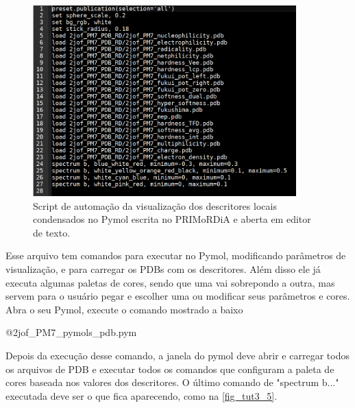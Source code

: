 \documentclass[a4paper,11pt]{refart}
\begin{document}
\hspace*{-\leftmarginwidth}
\begin{minipage}{\fullwidth}
	\begin{figure}[H]
		\begin{center}
			\includegraphics[width=4in]{images/tut3_img5}
			\caption{Script de automação da visualização dos descritores locais condensados no Pymol escrita no PRIMoRDiA e aberta em editor de texto.}
			\label{fig_tut3_3}
		\end{center}
	\end{figure}
\end{minipage}

Esse arquivo tem comandos para executar no Pymol, modificando parâmetros de visualização, e para carregar os PDBs com os descritores. Além disso ele já executa algumas paletas de cores, sendo que uma vai sobrepondo a outra, mas servem para o usuário pegar e escolher uma ou modificar seus parâmetros e cores. Abra o seu Pymol,  execute o comando mostrado a baixo

\hspace*{-\leftmarginwidth}
\begin{minipage}{\fullwidth}
	\begin{pymol}@2jof_PM7_pymols_pdb.pym\end{pymol}
\end{minipage}

Depois da execução desse comando, a janela do pymol deve abrir e carregar todos os arquivos de PDB e executar todos os comandos que configuram a paleta de cores baseada nos valores dos descritores. O último comando de "spectrum b..." executada deve ser o que fica aparecendo, como na \autoref{fig_tut3_5}.
\end{document}
